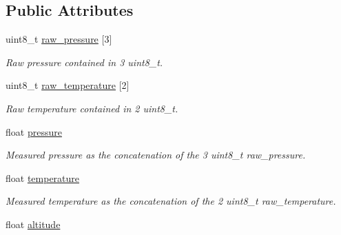 \subsection*{Public Attributes}
\begin{DoxyCompactItemize}
\item 
\hypertarget{structbarometer__t_a1dd862392e847229a1a532da7a0a81fc}{uint8\+\_\+t \hyperlink{structbarometer__t_a1dd862392e847229a1a532da7a0a81fc}{raw\+\_\+pressure} \mbox{[}3\mbox{]}}\label{structbarometer__t_a1dd862392e847229a1a532da7a0a81fc}

\begin{DoxyCompactList}\small\item\em Raw pressure contained in 3 uint8\+\_\+t. \end{DoxyCompactList}\item 
\hypertarget{structbarometer__t_a577b683f8a5e2563c36982c432dca646}{uint8\+\_\+t \hyperlink{structbarometer__t_a577b683f8a5e2563c36982c432dca646}{raw\+\_\+temperature} \mbox{[}2\mbox{]}}\label{structbarometer__t_a577b683f8a5e2563c36982c432dca646}

\begin{DoxyCompactList}\small\item\em Raw temperature contained in 2 uint8\+\_\+t. \end{DoxyCompactList}\item 
\hypertarget{structbarometer__t_af04f63ccc603890322d7c69620c46659}{float \hyperlink{structbarometer__t_af04f63ccc603890322d7c69620c46659}{pressure}}\label{structbarometer__t_af04f63ccc603890322d7c69620c46659}

\begin{DoxyCompactList}\small\item\em Measured pressure as the concatenation of the 3 uint8\+\_\+t raw\+\_\+pressure. \end{DoxyCompactList}\item 
\hypertarget{structbarometer__t_a77581284271f81b7c5de624891bb7cff}{float \hyperlink{structbarometer__t_a77581284271f81b7c5de624891bb7cff}{temperature}}\label{structbarometer__t_a77581284271f81b7c5de624891bb7cff}

\begin{DoxyCompactList}\small\item\em Measured temperature as the concatenation of the 2 uint8\+\_\+t raw\+\_\+temperature. \end{DoxyCompactList}\item 
\hypertarget{structbarometer__t_aa9ed170fddcf0f2f3caafdd11c2b675a}{float \hyperlink{structbarometer__t_aa9ed170fddcf0f2f3caafdd11c2b675a}{altitude}}\label{structbarometer__t_aa9ed170fddcf0f2f3caafdd11c2b675a}


\end{DoxyCompactItemize}
